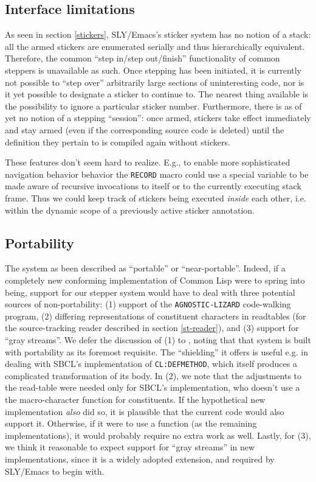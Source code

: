 \documentclass[sigconf]{acmart}
\begin{document}
\subsection{Interface limitations}

As seen in section \ref{stickers}, SLY/Emacs's sticker system has no
notion of a stack: all the armed stickers are enumerated serially and
thus hierarchically equivalent.  Therefore, the common ``step in/step
out/finish'' functionality of common steppers is unavailable as such.
Once stepping has been initiated, it is currently not possible to
``step over'' arbitrarily large sections of uninteresting code, nor is
it yet possible to designate a sticker to continue to.  The nearest
thing available is the possibility to ignore a particular sticker
number.  Furthermore, there is as of yet no notion of a stepping
``session'': once armed, stickers take effect immediately and stay
armed (even if the corresponding source code is deleted) until the
definition they pertain to is compiled again without stickers.

These features don't seem hard to realize.  E.g., to enable more
sophisticated navigation behavior behavior the \texttt{RECORD} macro
could use a special variable to be made aware of recursive invocations
to itself or to the currently executing stack frame.  Thus we could
keep track of stickers being executed \emph{inside} each other,
i.e. within the dynamic scope of a previously active sticker
annotation.

\subsection{Portability}

The system as been described as ``portable'' or ``near-portable''.
Indeed, if a completely new conforming implementation of Common Lisp
were to spring into being, support for our stepper system would have
to deal with three potential sources of non-portability: (1) support
of the \texttt{AGNOSTIC-LIZARD} code-walking program, (2) differing
representations of constituent characters in readtables (for the
source-tracking reader described in section \ref{st-reader}), and (3)
support for ``gray streams''.  We defer the discussion of (1) to
\cite{agnostic-lizard}, noting that that system is built with
portability as its foremost requisite.  The ``shielding'' it offers is
useful e.g. in dealing with SBCL's implementation of
\texttt{CL:DEFMETHOD}, which itself produces a complicated
transformation of its body.  In (2), we note that the adjustments to
the read-table were needed only for SBCL's implementation, who doesn't
use a the macro-character function for constituents.  If the
hypothetical new implementation \emph{also} did so, it is plausible
that the current code would also support it.  Otherwise, if it were to
use a function (as the remaining implementations), it would probably
require no extra work as well.  Lastly, for (3), we think it
reasonable to expect support for ``gray streams'' in new
implementations, since it is a widely adopted extension, and required
by SLY/Emacs to begin with.
\end{document}
